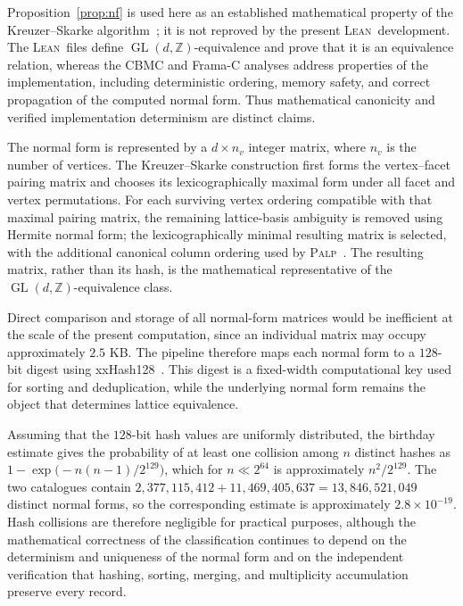 \documentclass[appliedmath,article,submit,moreauthors]{Definitions/mdpi}
\newcommand{\Z}{\mathbb{Z}}
\newcommand{\GL}{\operatorname{GL}}
\newcommand{\Lean}{\textsc{Lean}}
\newcommand{\PALP}{\textsc{Palp}}
\begin{document}
{\color{blue}
Proposition~\ref{prop:nf} is used here as an established mathematical property
of the Kreuzer--Skarke algorithm~\cite{PALP,GrinisKasprzyk2013}; it is not
reproved by the present \Lean\ development. The \Lean\ files define
\(\GL(d,\Z)\)-equivalence and prove that it is an equivalence relation, whereas
the CBMC and Frama-C analyses address properties of the implementation,
including deterministic ordering, memory safety, and correct propagation of
the computed normal form. Thus mathematical canonicity and verified
implementation determinism are distinct claims.
}

{\color{blue}
The normal form is represented by a \(d\times n_v\) integer matrix, where
\(n_v\) is the number of vertices. The Kreuzer--Skarke construction first
forms the vertex--facet pairing matrix and chooses its lexicographically
maximal form under all facet and vertex permutations. For each surviving
vertex ordering compatible with that maximal pairing matrix, the remaining
lattice-basis ambiguity is removed using Hermite normal form; the
lexicographically minimal resulting matrix is selected, with the additional
canonical column ordering used by \PALP~\cite{KreuzerSkarke1998,PALP,GrinisKasprzyk2013}.
The resulting matrix, rather than its hash, is the mathematical representative
of the \(\GL(d,\Z)\)-equivalence class.
}

Direct comparison and storage of all normal-form matrices would be inefficient
at the scale of the present computation, since an individual matrix may occupy
approximately \(2.5\) KB. The pipeline therefore maps each normal form to a
\(128\)-bit digest using xxHash128~\cite{xxHash}. This digest is a fixed-width
computational key used for sorting and deduplication, while the underlying
normal form remains the object that determines lattice equivalence.

Assuming that the \(128\)-bit hash values are uniformly distributed, the
birthday estimate gives the probability of at least one collision among \(n\)
distinct hashes as \(1-\exp\bigl(-n(n-1)/2^{129}\bigr)\), which for \(n\ll
2^{64}\) is approximately \(n^2/2^{129}\). The two catalogues contain
\(2{,}377{,}115{,}412+11{,}469{,}405{,}637=13{,}846{,}521{,}049\) distinct
normal forms, so the corresponding estimate is approximately
\(2.8\times10^{-19}\). Hash collisions are therefore negligible for practical
purposes, although the mathematical correctness of the classification continues
to depend on the determinism and uniqueness of the normal form and on the
independent verification that hashing, sorting, merging, and multiplicity
accumulation preserve every record.
\end{document}
